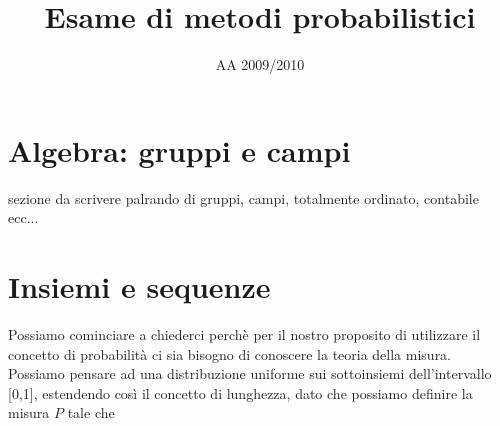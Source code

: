 \documentclass[a4paper,11pt]{article}
\begin{document}
\title{Esame di metodi probabilistici}
\date{AA 2009/2010}
\maketitle








\section{Algebra: gruppi e campi}

sezione da scrivere palrando di gruppi, campi, totalmente ordinato, contabile ecc...



\section{Insiemi e sequenze}

Possiamo cominciare a chiederci perchè per il nostro proposito di utilizzare il concetto di probabilità ci sia bisogno di conoscere la teoria della misura.
Possiamo pensare ad una distribuzione uniforme sui sottoinsiemi dell'intervallo  [0,1], estendendo così il concetto di lunghezza, dato che possiamo definire la misura $P$ tale che
\end{document}
